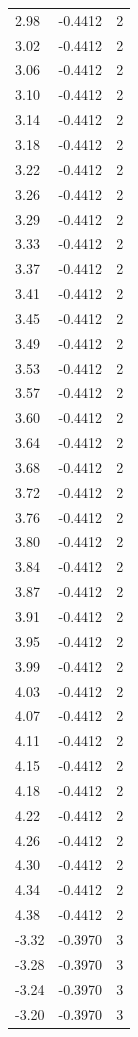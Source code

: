 \begin{longtable}{lrr}
  2.98 & -0.4412 & 2 \\
  3.02 & -0.4412 & 2 \\
  3.06 & -0.4412 & 2 \\
  3.10 & -0.4412 & 2 \\
  3.14 & -0.4412 & 2 \\
  3.18 & -0.4412 & 2 \\
  3.22 & -0.4412 & 2 \\
  3.26 & -0.4412 & 2 \\
  3.29 & -0.4412 & 2 \\
  3.33 & -0.4412 & 2 \\
  3.37 & -0.4412 & 2 \\
  3.41 & -0.4412 & 2 \\
  3.45 & -0.4412 & 2 \\
  3.49 & -0.4412 & 2 \\
  3.53 & -0.4412 & 2 \\
  3.57 & -0.4412 & 2 \\
  3.60 & -0.4412 & 2 \\
  3.64 & -0.4412 & 2 \\
  3.68 & -0.4412 & 2 \\
  3.72 & -0.4412 & 2 \\
  3.76 & -0.4412 & 2 \\
  3.80 & -0.4412 & 2 \\
  3.84 & -0.4412 & 2 \\
  3.87 & -0.4412 & 2 \\
  3.91 & -0.4412 & 2 \\
  3.95 & -0.4412 & 2 \\
  3.99 & -0.4412 & 2 \\
  4.03 & -0.4412 & 2 \\
  4.07 & -0.4412 & 2 \\
  4.11 & -0.4412 & 2 \\
  4.15 & -0.4412 & 2 \\
  4.18 & -0.4412 & 2 \\
  4.22 & -0.4412 & 2 \\
  4.26 & -0.4412 & 2 \\
  4.30 & -0.4412 & 2 \\
  4.34 & -0.4412 & 2 \\
  4.38 & -0.4412 & 2 \\
  -3.32 & -0.3970 & 3 \\
  -3.28 & -0.3970 & 3 \\
  -3.24 & -0.3970 & 3 \\
  -3.20 & -0.3970 & 3 \\

\end{longtable}

